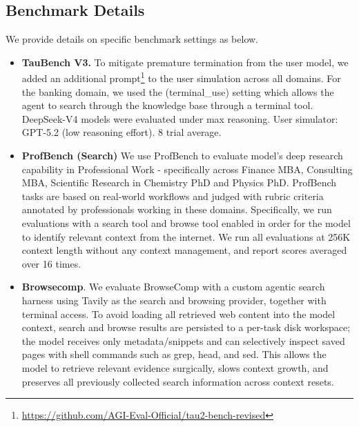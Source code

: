 \subsection{Benchmark Details}
We provide details on specific benchmark settings as below.
\begin{itemize}
    \item \textbf{TauBench V3.} To mitigate premature termination from the user model, we added an additional prompt\footnote{\url{https://github.com/AGI-Eval-Official/tau2-bench-revised}} to the user simulation across all domains. For the banking domain, we used the (terminal\_use) setting which allows the agent to search through the knowledge base through a terminal tool. DeepSeek-V4 models were evaluated under max reasoning. User simulator: GPT-5.2 (low reasoning effort). 8 trial average.
    
    \item \textbf{ProfBench (Search)} We use ProfBench \citep{wang2026profbench} to evaluate model's deep research capability in Professional Work - specifically across Finance MBA, Consulting MBA, Scientific Research in Chemistry PhD and Physics PhD. ProfBench tasks are based on real-world workflows and judged with rubric criteria annotated by professionals working in these domains. Specifically, we run evaluations with a search tool and browse tool enabled in order for the model to identify relevant context from the internet. We run all evaluations at 256K context length without any context management, and report scores averaged over 16 times. 
    
    \item \textbf{Browsecomp}. We evaluate BrowseComp with a custom agentic search harness using Tavily as the search and browsing provider, together with terminal access. To avoid loading all retrieved web content into the model context, search and browse results are persisted to a per-task disk workspace; the model receives only metadata/snippets and can selectively inspect saved pages with shell commands such as grep, head, and sed. This allows the model to retrieve relevant evidence surgically, slows context growth, and preserves all previously collected search information across context resets.
   

\end{itemize}
